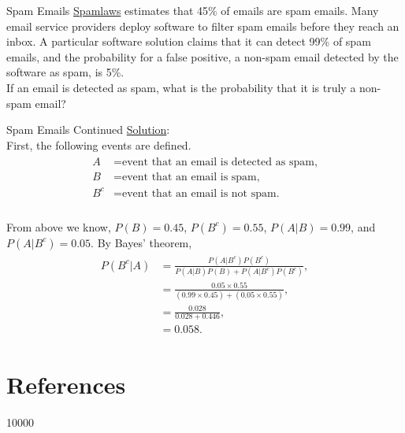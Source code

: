 \documentclass[pdf]{beamer}
\theoremstyle{remark}
\theoremstyle{definition}
\begin{document}
\begin{frame}[t]{Spam Emails}
\href{https://www.spamlaws.com/spam-stats.html}{Spamlaws} estimates that 45\% of emails are spam emails. Many email service providers deploy software to filter spam emails before they reach an inbox. A particular software solution claims that it can detect 99\% of spam emails, and the probability for a false positive, a non-spam email detected by the software as spam, is 5\%. \\
\vspace{1.5ex}
If an email is detected as spam, what is the probability that it is truly a non-spam email? \\
\end{frame}

\begin{frame}[t]{Spam Emails Continued}
\small
\underline{Solution}: \\
\vspace{1.5ex}
First, the following events are defined. \\
\vspace{-1.5ex}
\begin{align} \nonumber
\begin{split}
A & = \text{event that an email is detected as spam,} \\
B & = \text{event that an email is spam,} \\
B^c & = \text{event that an email is not spam.}
\end{split}
\end{align}  
\\
\vspace{0.5ex}
From above we know, $P(B) = 0.45$, $P(B^c) = 0.55$, $P(A|B) = 0.99$, and $P(A|B^c) = 0.05.$   By Bayes' theorem, \\
\vspace{0.0ex}
\begin{align} \nonumber
\begin{split}
P(B^c|A) & =  \frac{P(A|B^c)P(B^c)}{P(A|B)P(B)+P(A|B^c)P(B^c)}, \\
 & = \frac{0.05\times0.55}{ (0.99\times 0.45) +(0.05\times0.55)},  \\
& = \frac{0.028}{0.028 + 0.446}, \\
& = 0.058.
\end{split}
\end{align}
\end{frame}

\section{References}

\begin{frame}[t,allowframebreaks]
 10000
\small


\end{frame}
\end{document}
